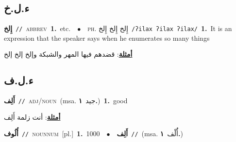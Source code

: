 \documentclass[10pt,a4paper,twoside]{article} %
\begin{document}
\begin{multicols}{2}
\vspace{-3mm}
\subsection*{\color{blue}\foreignlanguage{arabic}{ء.ل.خ}\color{blue}{ (ntws)}} 

{\setlength\topsep{0pt}\textbf{\foreignlanguage{arabic}{إِلخ}}\ {\color{gray}\texttt{//}\color{black}}\ \textsc{abbrev}\ \textbf{1.}~etc.\ \ $\bullet$\ \ \textsc{ph.} \color{gray} \foreignlanguage{arabic}{إِلخ إِلخ إِلخ}\color{black}\ {\color{gray}\texttt{/{\sffamily ʔilax ʔilax ʔilax}/}\color{black}}\ \textbf{1.}~It is an expression that the speaker says when he enumerates so many things\  \begin{flushright}\color{gray}\foreignlanguage{arabic}{\textbf{\underline{\foreignlanguage{arabic}{أمثلة}}}: قضدهم فيها المهر والشبكة وإلخ إلخ إلخ}\end{flushright}\color{black}} \vspace{2mm}

\vspace{-3mm}
\subsection*{\color{blue}\foreignlanguage{arabic}{ء.ل.ف}\color{blue}{}} 

{\setlength\topsep{0pt}\textbf{\foreignlanguage{arabic}{أَلِف}}\ {\color{gray}\texttt{//}\color{black}}\ \textsc{adj/noun}\ \color{gray}(msa. \foreignlanguage{arabic}{جيد}~\foreignlanguage{arabic}{\textbf{١.}})\color{black}\ \textbf{1.}~good\  \begin{flushright}\color{gray}\foreignlanguage{arabic}{\textbf{\underline{\foreignlanguage{arabic}{أمثلة}}}: أنت زلمة أَلِف}\end{flushright}\color{black}} \vspace{2mm}

{\setlength\topsep{0pt}\textbf{\foreignlanguage{arabic}{أُلُوف}}\ {\color{gray}\texttt{//}\color{black}}\ \textsc{noun\textunderscore num}\ [pl.]\ \textbf{1.}~1000\ \ $\bullet$\ \ \setlength\topsep{0pt}\textbf{\foreignlanguage{arabic}{أَلِف}}\ {\color{gray}\texttt{//}\color{black}}\ \color{gray}(msa. \foreignlanguage{arabic}{أَُلْف}~\foreignlanguage{arabic}{\textbf{١.}})\color{black}\ } \vspace{2mm}


\end{multicols}
\end{document}
